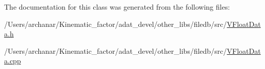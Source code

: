 The documentation for this class was generated from the following files\+:\begin{DoxyCompactItemize}
\item 
/\+Users/archanar/\+Kinematic\+\_\+factor/adat\+\_\+devel/other\+\_\+libs/filedb/src/\mbox{\hyperlink{VFloatData_8h}{V\+Float\+Data.\+h}}\item 
/\+Users/archanar/\+Kinematic\+\_\+factor/adat\+\_\+devel/other\+\_\+libs/filedb/src/\mbox{\hyperlink{VFloatData_8cpp}{V\+Float\+Data.\+cpp}}\end{DoxyCompactItemize}
